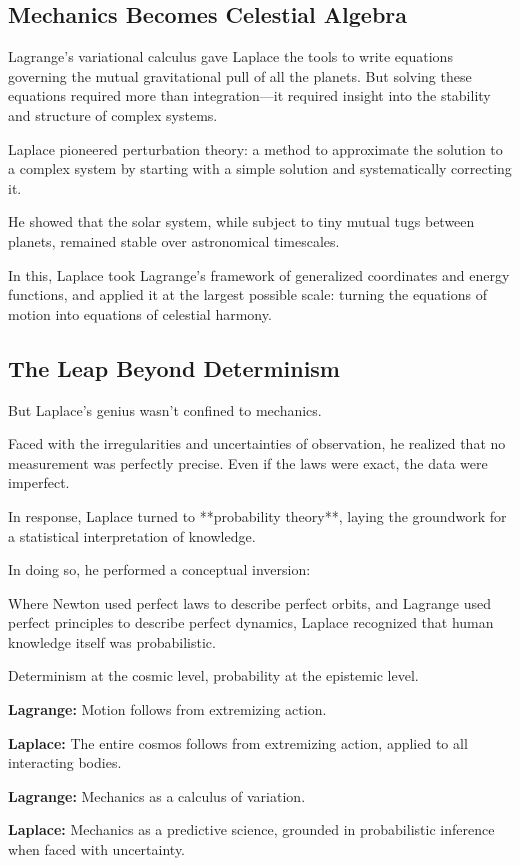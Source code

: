 \bigskip

\subsection*{Mechanics Becomes Celestial Algebra}

Lagrange’s variational calculus gave Laplace the tools to write equations governing the mutual gravitational pull of all the planets.  
But solving these equations required more than integration—it required insight into the stability and structure of complex systems.

Laplace pioneered perturbation theory:  
a method to approximate the solution to a complex system by starting with a simple solution and systematically correcting it.

He showed that the solar system, while subject to tiny mutual tugs between planets, remained stable over astronomical timescales.

In this, Laplace took Lagrange’s framework of generalized coordinates and energy functions, and applied it at the largest possible scale:  
turning the equations of motion into equations of celestial harmony.

\bigskip

\subsection*{The Leap Beyond Determinism}

But Laplace’s genius wasn’t confined to mechanics.

Faced with the irregularities and uncertainties of observation,  
he realized that no measurement was perfectly precise.  
Even if the laws were exact, the data were imperfect.

In response, Laplace turned to **probability theory**,  
laying the groundwork for a statistical interpretation of knowledge.

In doing so, he performed a conceptual inversion:

Where Newton used perfect laws to describe perfect orbits,  
and Lagrange used perfect principles to describe perfect dynamics,  
Laplace recognized that human knowledge itself was probabilistic.

Determinism at the cosmic level,  
probability at the epistemic level.

\bigskip

\begin{tcolorbox}[colback=gray!5!white, colframe=black, title=\textbf{Sidebar: The Arc from Lagrange to Laplace}, fonttitle=\bfseries, arc=1.5mm, boxrule=0.4pt]

\textbf{Lagrange:} Motion follows from extremizing action.

\textbf{Laplace:} The entire cosmos follows from extremizing action, applied to all interacting bodies.

\medskip

\textbf{Lagrange:} Mechanics as a calculus of variation.

\textbf{Laplace:} Mechanics as a predictive science, grounded in probabilistic inference when faced with uncertainty.

\end{tcolorbox}

